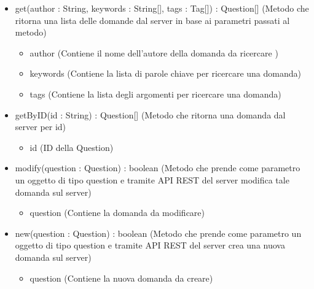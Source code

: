 \begin{description}
\begin{itemize}
\item get(author : String, keywords : String[], tags : Tag[]) : Question[] (Metodo che ritorna una lista delle domande dal server in base ai parametri passati al metodo)\begin{itemize}
\item author (Contiene il nome dell'autore della domanda da ricercare )
\item keywords (Contiene la lista di parole chiave per ricercare una domanda)
\item tags (Contiene la lista degli argomenti per ricercare una domanda)
\end{itemize}

\item getByID(id : String) : Question[] (Metodo che ritorna una domanda dal server per id)\begin{itemize}
\item id (ID della Question)
\end{itemize}

\item modify(question : Question) : boolean (Metodo che prende come parametro un oggetto di tipo question e tramite API REST del server modifica tale domanda sul server)\begin{itemize}
\item question (Contiene la domanda da modificare)
\end{itemize}

\item new(question : Question) : boolean (Metodo che prende come parametro un oggetto di tipo question e tramite API REST del server crea una nuova domanda sul server)\begin{itemize}
\item question (Contiene la nuova domanda da creare)
\end{itemize}

\end{itemize}

\end{description}

